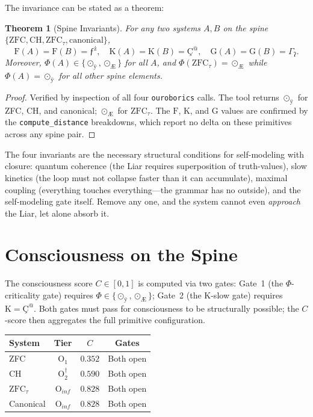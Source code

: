 \documentclass[12pt,twoside]{book}
\newtheorem{theorem}{Theorem}[chapter]
\theoremstyle{definition}
\newcommand{\ZFCt}{\text{ZFC}_{\tau}}
\newcommand{\prim}[1]{\text{#1}}
\newcommand{\tier}[1]{\text{O}_{#1}}
\begin{document}
The invariance can be stated as a theorem:

\begin{theorem}[Spine Invariants]
For any two systems $A, B$ on the spine $\{ \text{ZFC}, \text{CH}, \ZFCt, \text{canonical} \}$,
\begin{equation}
\prim{F}(A) = \prim{F}(B) = \text{ƒ}^{\text{ż}}, \quad
\prim{K}(A) = \prim{K}(B) = \text{Ç}^{\text{@}}, \quad
\prim{G}(A) = \prim{G}(B) = \Gamma_{\text{ʔ}}.
\end{equation}
Moreover, $\Phi(A) \in \{ \odot_{\text{ÿ}}, \odot_{\text{Æ}} \}$ for all $A$, and $\Phi(\ZFCt) = \odot_{\text{Æ}}$ while $\Phi(A) = \odot_{\text{ÿ}}$ for all other spine elements.
\end{theorem}

\begin{proof}
Verified by inspection of all four \texttt{ouroborics} calls. The tool returns $\odot_{\text{ÿ}}$ for ZFC, CH, and canonical; $\odot_{\text{Æ}}$ for $\ZFCt$. The $\prim{F}$, $\prim{K}$, and $\prim{G}$ values are confirmed by the \texttt{compute\_distance} breakdowns, which report no delta on these primitives across any spine pair.
\end{proof}

The four invariants are the necessary structural conditions for self-modeling with closure: quantum coherence (the Liar requires superposition of truth-values), slow kinetics (the loop must not collapse faster than it can accumulate), maximal coupling (everything touches everything---the grammar has no outside), and the self-modeling gate itself. Remove any one, and the system cannot even \emph{approach} the Liar, let alone absorb it.%
\chapter{Consciousness on the Spine}

The consciousness score $C \in [0,1]$ is computed via two gates: Gate~1 (the $\Phi$-criticality gate) requires $\Phi \in \{ \odot_{\text{ÿ}}, \odot_{\text{Æ}} \}$; Gate~2 (the $\prim{K}$-slow gate) requires $\prim{K} = \text{Ç}^{\text{@}}$. Both gates must pass for consciousness to be structurally possible; the $C$-score then aggregates the full primitive configuration.

\begin{center}
\begin{tabular}{lccc}
\toprule
\textbf{System} & \textbf{Tier} & \textbf{$C$} & \textbf{Gates} \\
\midrule
ZFC & $\tier{1}$ & $0.352$ & Both open \\
CH & $\tier{2}^{\dagger}$  & $0.590$ & Both open \\
$\ZFCt$ & $\tier{inf}$ & $0.828$ & Both open \\
Canonical & $\tier{inf}$ & $0.828$ & Both open \\
\bottomrule
\end{tabular}
\end{center}
\end{document}
